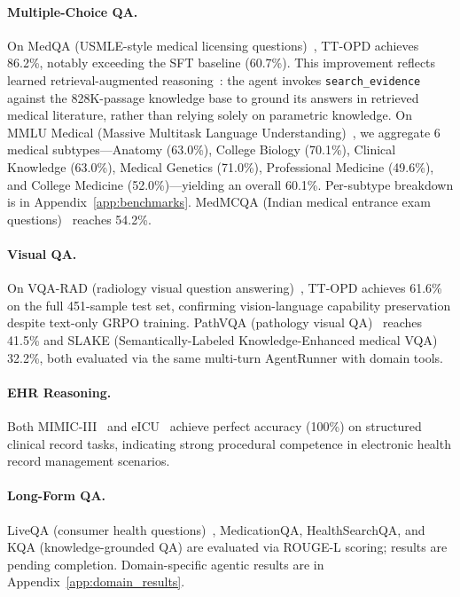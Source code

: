 \documentclass{article}
\begin{document}
\paragraph{Multiple-Choice QA.} On MedQA (USMLE-style medical licensing questions)~\citep{jin2021medqa}, TT-OPD achieves 86.2\%, notably exceeding the SFT baseline (60.7\%). This improvement reflects learned retrieval-augmented reasoning~\citep{lewis2020rag}: the agent invokes \texttt{search\_evidence} against the 828K-passage knowledge base to ground its answers in retrieved medical literature, rather than relying solely on parametric knowledge. On MMLU Medical (Massive Multitask Language Understanding)~\citep{hendrycks2021mmlu}, we aggregate 6 medical subtypes---Anatomy (63.0\%), College Biology (70.1\%), Clinical Knowledge (63.0\%), Medical Genetics (71.0\%), Professional Medicine (49.6\%), and College Medicine (52.0\%)---yielding an overall 60.1\%. Per-subtype breakdown is in Appendix~\ref{app:benchmarks}. MedMCQA (Indian medical entrance exam questions)~\citep{pal2022medmcqa} reaches 54.2\%.

\paragraph{Visual QA.} On VQA-RAD (radiology visual question answering)~\citep{lau2018vqarad}, TT-OPD achieves 61.6\% on the full 451-sample test set, confirming vision-language capability preservation despite text-only GRPO training. PathVQA (pathology visual QA)~\citep{he2020pathvqa} reaches 41.5\% and SLAKE (Semantically-Labeled Knowledge-Enhanced medical VQA)~\citep{liu2021slake} 32.2\%, both evaluated via the same multi-turn AgentRunner with domain tools.

\paragraph{EHR Reasoning.} Both MIMIC-III~\citep{johnson2016mimiciii} and eICU~\citep{pollard2018eicu} achieve perfect accuracy (100\%) on structured clinical record tasks, indicating strong procedural competence in electronic health record management scenarios.

\paragraph{Long-Form QA.} LiveQA (consumer health questions)~\citep{abacha2019liveqa}, MedicationQA, HealthSearchQA, and KQA (knowledge-grounded QA) are evaluated via ROUGE-L scoring; results are pending completion. Domain-specific agentic results are in Appendix~\ref{app:domain_results}.
\end{document}
